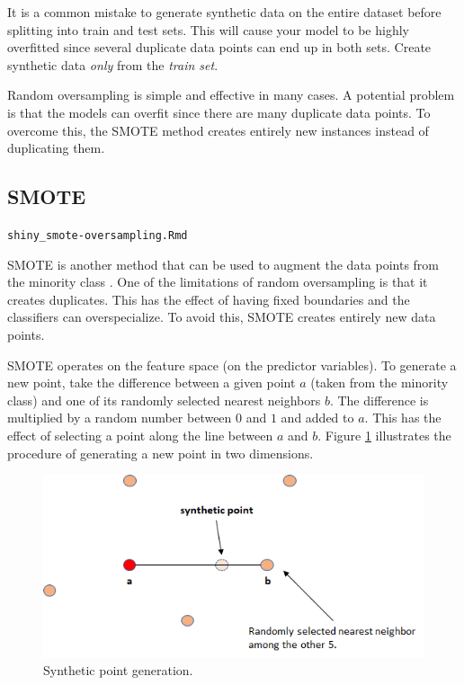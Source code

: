 \documentclass[
  11pt,
]{krantz}
\makeatletter
\newenvironment{kframe}{%
\medskip{}
\setlength{\fboxsep}{.8em}
 \def\at@end@of@kframe{}%
 \ifinner\ifhmode%
  \def\at@end@of@kframe{\end{minipage}}%
  \begin{minipage}{\columnwidth}%
 \fi\fi%
 \def\FrameCommand##1{\hskip\@totalleftmargin \hskip-\fboxsep
 \colorbox{shadecolor}{##1}\hskip-\fboxsep
     \hskip-\linewidth \hskip-\@totalleftmargin \hskip\columnwidth}%
 \MakeFramed {\advance\hsize-\width
   \@totalleftmargin\z@ \linewidth\hsize
   \@setminipage}}%
 {\par\unskip\endMakeFramed%
 \at@end@of@kframe}
\newenvironment{rmdblock}[1]
  {
  \begin{itemize}
  \renewcommand{\labelitemi}{
    \raisebox{-.7\height}[0pt][0pt]{
      {\setkeys{Gin}{width=3em,keepaspectratio}\texttt{[image: images/icons/\#1]}}
    }
  }
  \setlength{\fboxsep}{1em}
  \begin{kframe}
  \item
  }
  {
  \end{kframe}
  \end{itemize}
  }
\newenvironment{rmdcaution}
  {\begin{rmdblock}{caution}}
  {\end{rmdblock}}
\newenvironment{rmdshiny}
  {\begin{rmdblock}{touch}}
  {\end{rmdblock}}
\makeatother
\begin{document}
\begin{rmdcaution}
It is a common mistake to generate synthetic data on the entire dataset before splitting into train and test sets. This will cause your model to be highly overfitted since several duplicate data points can end up in both sets. Create synthetic data \emph{only} from the \emph{train set}.
\end{rmdcaution}

Random oversampling is simple and effective in many cases. A potential problem is that the models can overfit since there are many duplicate data points. To overcome this, the SMOTE method creates entirely new instances instead of duplicating them.

\hypertarget{smote}{%
\subsection{SMOTE}\label{smote}}

\begin{rmdshiny}
\texttt{shiny\_smote-oversampling.Rmd}
\end{rmdshiny}

SMOTE is another method that can be used to augment the data points from the minority class \citep{chawla2002smote}. One of the limitations of random oversampling is that it creates duplicates. This has the effect of having fixed boundaries and the classifiers can overspecialize. To avoid this, SMOTE creates entirely new data points.

SMOTE operates on the feature space (on the predictor variables). To generate a new point, take the difference between a given point \(a\) (taken from the minority class) and one of its randomly selected nearest neighbors \(b\). The difference is multiplied by a random number between \(0\) and \(1\) and added to \(a\). This has the effect of selecting a point along the line between \(a\) and \(b\). Figure \ref{fig:newpoint} illustrates the procedure of generating a new point in two dimensions.

\begin{figure}

{\centering \includegraphics[width=0.5\linewidth]{images/smote_newpoint} 

}

\caption{Synthetic point generation.}\label{fig:newpoint}
\end{figure}
\end{document}
